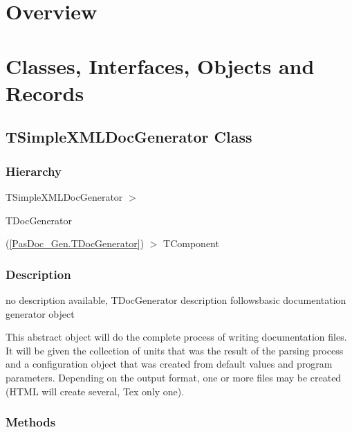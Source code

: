 \documentclass{report}
\newif\ifpdf
\begin{document}
\section{Overview}
\begin{description}
\item[\texttt{\begin{ttfamily}TSimpleXMLDocGenerator\end{ttfamily} Class}]
\end{description}
\section{Classes, Interfaces, Objects and Records}
\ifpdf
\subsection*{\large{\textbf{TSimpleXMLDocGenerator Class}}\normalsize\hspace{1ex}\hrulefill}
\else
\subsection*{TSimpleXMLDocGenerator Class}
\fi
\label{PasDoc_GenSimpleXML.TSimpleXMLDocGenerator}
\subsubsection*{\large{\textbf{Hierarchy}}\normalsize\hspace{1ex}\hfill}
TSimpleXMLDocGenerator {$>$} \begin{ttfamily}TDocGenerator\end{ttfamily}(\ref{PasDoc_Gen.TDocGenerator}) {$>$} 
TComponent
\subsubsection*{\large{\textbf{Description}}\normalsize\hspace{1ex}\hfill}
no description available, TDocGenerator description followsbasic documentation generator object\hfill\vspace*{1ex}

 This abstract object will do the complete process of writing documentation files. It will be given the collection of units that was the result of the parsing process and a configuration object that was created from default values and program parameters. Depending on the output format, one or more files may be created (HTML will create several, Tex only one).\subsubsection*{\large{\textbf{Methods}}\normalsize\hspace{1ex}\hfill}
\end{document}

